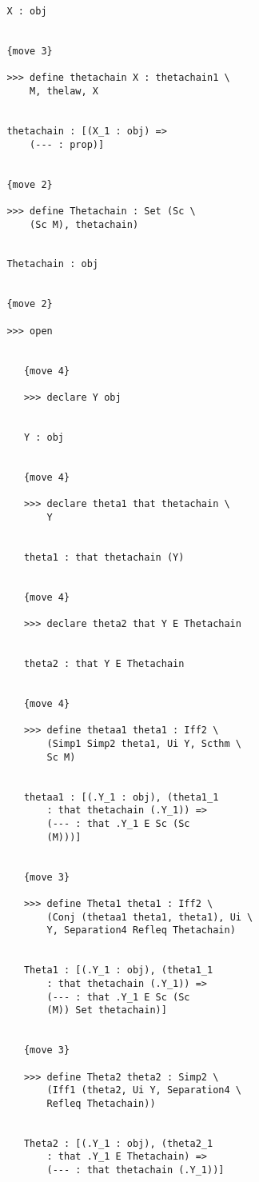 \documentclass[12pt]{article}
\begin{document}
\begin{verbatim}
         X : obj


         {move 3}

         >>> define thetachain X : thetachain1 \
             M, thelaw, X


         thetachain : [(X_1 : obj) => 
             (--- : prop)]


         {move 2}

         >>> define Thetachain : Set (Sc \
             (Sc M), thetachain)


         Thetachain : obj


         {move 2}

         >>> open


            {move 4}

            >>> declare Y obj


            Y : obj


            {move 4}

            >>> declare theta1 that thetachain \
                Y


            theta1 : that thetachain (Y)


            {move 4}

            >>> declare theta2 that Y E Thetachain


            theta2 : that Y E Thetachain


            {move 4}

            >>> define thetaa1 theta1 : Iff2 \
                (Simp1 Simp2 theta1, Ui Y, Scthm \
                Sc M)


            thetaa1 : [(.Y_1 : obj), (theta1_1 
                : that thetachain (.Y_1)) => 
                (--- : that .Y_1 E Sc (Sc 
                (M)))]


            {move 3}

            >>> define Theta1 theta1 : Iff2 \
                (Conj (thetaa1 theta1, theta1), Ui \
                Y, Separation4 Refleq Thetachain)


            Theta1 : [(.Y_1 : obj), (theta1_1 
                : that thetachain (.Y_1)) => 
                (--- : that .Y_1 E Sc (Sc 
                (M)) Set thetachain)]


            {move 3}

            >>> define Theta2 theta2 : Simp2 \
                (Iff1 (theta2, Ui Y, Separation4 \
                Refleq Thetachain))


            Theta2 : [(.Y_1 : obj), (theta2_1 
                : that .Y_1 E Thetachain) => 
                (--- : that thetachain (.Y_1))]



\end{verbatim}
\end{document}
